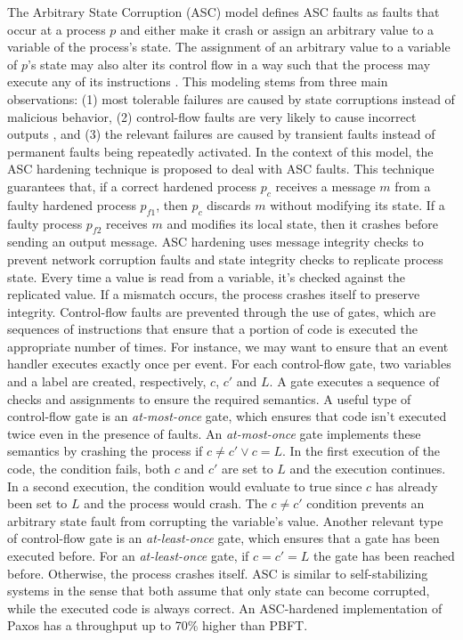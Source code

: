 The Arbitrary State Corruption (ASC) model defines ASC faults as faults that occur at a process $p$ and either make it crash or assign an arbitrary value to a variable of the process's state. The assignment of an arbitrary value to a variable of $p$'s state may also alter its control flow in a way such that the process may execute any of its instructions \cite{Correia2012}. This modeling stems from three main observations: (1) most tolerable failures are caused by state corruptions instead of malicious behavior, (2) control-flow faults are very likely to cause incorrect outputs \cite{Kalbarczyk2003}, and (3) the relevant failures are caused by transient faults instead of permanent faults being repeatedly activated. In the context of this model, the ASC hardening technique is proposed to deal with ASC faults. This technique guarantees that, if a correct hardened process $p_c$ receives a message $m$ from a faulty hardened process $p_{f1}$, then $p_c$ discards $m$ without modifying its state. If a faulty process $p_{f2}$ receives $m$ and modifies its local state, then it crashes before sending an output message. ASC hardening uses message integrity checks to prevent network corruption faults and state integrity checks to replicate process state. Every time a value is read from a variable, it's checked against the replicated value. If a mismatch occurs, the process crashes itself to preserve integrity. Control-flow faults are prevented through the use of gates, which are sequences of instructions that ensure that a portion of code is executed the appropriate number of times. For instance, we may want to ensure that an event handler executes exactly once per event. For each control-flow gate, two variables and a label are created, respectively, $c$, $c'$ and $L$. A gate executes a sequence of checks and assignments to ensure the required semantics. A useful type of control-flow gate is an \textit{at-most-once} gate, which ensures that code isn't executed twice even in the presence of faults. An \textit{at-most-once} gate implements these semantics by crashing the process if $c \neq c' \vee c=L$. In the first execution of the code, the condition fails, both $c$ and $c'$ are set to $L$ and the execution continues. In a second execution, the condition would evaluate to true since $c$ has already been set to $L$ and the process would crash. The $c \neq c'$ condition prevents an arbitrary state fault from corrupting the variable's value. Another relevant type of control-flow gate is an \textit{at-least-once} gate, which ensures that a gate has been executed before. For an \textit{at-least-once} gate, if $c=c'=L$ the gate has been reached before. Otherwise, the process crashes itself. ASC is similar to self-stabilizing systems \cite{Dijkstra1974} in the sense that both assume that only state can become corrupted, while the executed code is always correct. An ASC-hardened implementation of Paxos has a throughput up to 70\% higher than PBFT. \par
